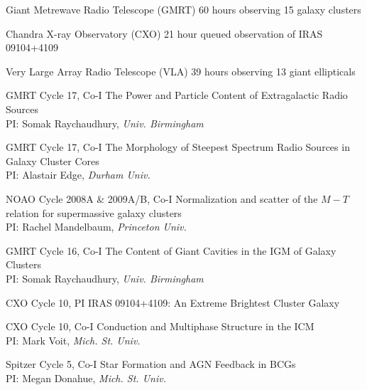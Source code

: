 \documentclass[12pt]{cv}
\begin{document}
\begin{llist}


Giant Metrewave Radio Telescope (GMRT)
60 hours observing 15 galaxy clusters

Chandra X-ray Observatory (CXO)
21 hour queued observation of IRAS 09104+4109

Very Large Array Radio Telescope (VLA)
39 hours observing 13 giant ellipticals



GMRT Cycle 17, Co-I
The Power and Particle Content of Extragalactic Radio Sources\\%
PI: Somak Raychaudhury, {\textit{Univ. Birmingham}}

GMRT Cycle 17, Co-I
The Morphology of Steepest Spectrum Radio Sources in Galaxy Cluster Cores\\%
PI: Alastair Edge, {\textit{Durham Univ.}}

NOAO Cycle 2008A \& 2009A/B, Co-I
Normalization and scatter of the $M-T$ relation for supermassive galaxy clusters\\
PI: Rachel Mandelbaum, {\textit{Princeton Univ.}}

GMRT Cycle 16, Co-I
The Content of Giant Cavities in the IGM of Galaxy Clusters\\%
PI: Somak Raychaudhury, {\textit{Univ. Birmingham}}

CXO Cycle 10, PI
IRAS 09104+4109: An Extreme Brightest Cluster Galaxy%

CXO Cycle 10, Co-I
Conduction and Multiphase Structure in the ICM\\%
PI: Mark Voit, {\textit{Mich. St. Univ.}}

Spitzer Cycle 5, Co-I
Star Formation and AGN Feedback in BCGs\\%
PI: Megan Donahue, {\textit{Mich. St. Univ.}}


\end{llist}
\end{document}
